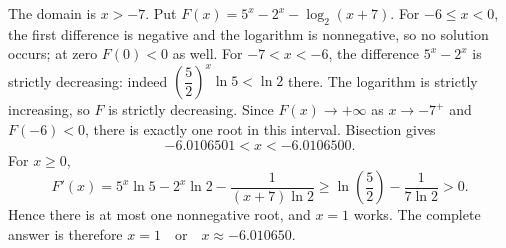 The domain is $x>-7$. Put $F(x)=5^x-2^x-\log_2(x+7)$.
For $-6\le x<0$, the first difference is negative and the logarithm is nonnegative, so no solution occurs; at zero $F(0)<0$ as well. For $-7<x<-6$, the difference $5^x-2^x$ is strictly decreasing: indeed $(\dfrac{5}{2})^x\ln5<\ln2$ there. The logarithm is strictly increasing, so $F$ is strictly decreasing. Since $F(x)\to+\infty$ as $x\to-7^+$ and $F(-6)<0$, there is exactly one root in this interval. Bisection gives
\[
-6.0106501<x<-6.0106500.
\]
For $x\ge0$,
\[
F'(x)=5^x\ln5-2^x\ln2-\dfrac{1}{(x+7)\ln2}
\ge\ln(\dfrac{5}{2})-\dfrac{1}{7\ln2}>0.
\]
Hence there is at most one nonnegative root, and $x=1$ works. The complete answer is therefore $\boxed{x=1\quad\text{or}\quad x\approx-6.010650}$.

